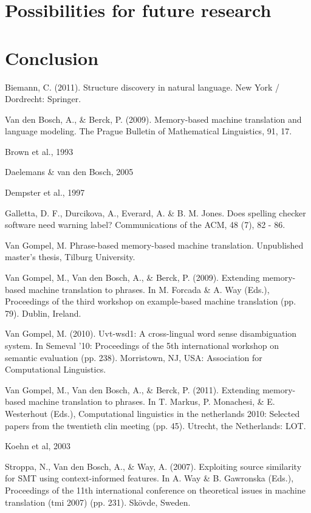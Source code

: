 \documentclass[12pt]{article}
\begin{document}
\section{Possibilities for future research}
\section{Conclusion}

\begin{thebibliography}{99}

Biemann, C. (2011). Structure discovery in natural language. New York / Dordrecht: Springer.

Van den Bosch, A., \& Berck, P. (2009). Memory-based machine translation and language
modeling. The Prague Bulletin of Mathematical Linguistics, 91, 17.

Brown et al., 1993

Daelemans \& van den Bosch, 2005

Dempster et al., 1997

Galletta, D. F., Durcikova, A., Everard, A. \& B. M. Jones. Does spelling checker software need warning label? Communications of the ACM, 48 (7), 82 - 86.

Van Gompel, M. Phrase-based memory-based machine translation. Unpublished
master's thesis, Tilburg University.

Van Gompel, M., Van den Bosch, A., \& Berck, P. (2009). Extending memory-based
machine translation to phrases. In M. Forcada \& A. Way (Eds.), Proceedings of the
third workshop on example-based machine translation (pp. 79). Dublin, Ireland.

Van Gompel, M. (2010). Uvt-wsd1: A cross-lingual word sense disambiguation system.
In Semeval '10: Proceedings of the 5th international workshop on semantic evaluation
(pp. 238). Morristown, NJ, USA: Association for Computational Linguistics.

Van Gompel, M., Van den Bosch, A., \& Berck, P. (2011). Extending memory-based
machine translation to phrases. In T. Markus, P. Monachesi, \& E. Westerhout (Eds.),
Computational linguistics in the netherlands 2010: Selected papers from the twentieth
clin meeting (pp. 45). Utrecht, the Netherlands: LOT.

Koehn et al, 2003

Stroppa, N., Van den Bosch, A., \& Way, A. (2007). Exploiting source similarity for SMT
using context-informed features. In A. Way \& B. Gawronska (Eds.), Proceedings of the
11th international conference on theoretical issues in machine translation (tmi 2007)
(pp. 231). Skövde, Sweden.

\end{thebibliography}
\end{document}
